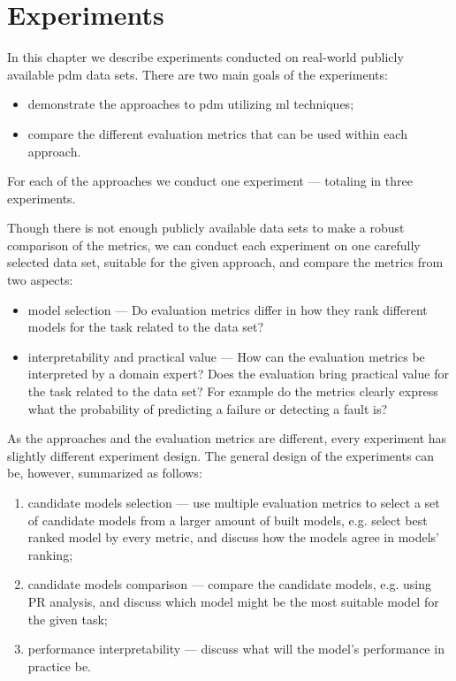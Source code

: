 \chapter{Experiments}
\label{chapter:experiments}

In this chapter we describe experiments conducted on real-world publicly available \gls{pdm} data sets.
There are two main goals of the experiments:
\begin{itemize}
    \item demonstrate the approaches to \gls{pdm} utilizing \gls{ml} techniques;
    \item compare the different evaluation metrics that can be used within each approach.
\end{itemize}
For each of the approaches we conduct one experiment --- totaling in three experiments.

Though there is not enough publicly available data sets to make a robust comparison of the metrics, we can conduct each experiment on one carefully selected data set, suitable for the given approach, and compare the metrics from two aspects:
\begin{itemize}
    \item model selection --- Do evaluation metrics differ in how they rank different models for the task related to the data set?
    \item interpretability and practical value --- How can the evaluation metrics be interpreted by a domain expert? Does the evaluation bring practical value for the task related to the data set? For example do the metrics clearly express what the probability of predicting a failure or detecting a fault is?
\end{itemize}

As the approaches and the evaluation metrics are different, every experiment has slightly different experiment design.
The general design of the experiments can be, however, summarized as follows:
\begin{enumerate}
    \item candidate models selection --- use multiple evaluation metrics to select a set of candidate models from a larger amount of built models, e.g. select best ranked model by every metric, and discuss how the models agree in models' ranking;
    \item candidate models comparison --- compare the candidate models, e.g. using PR analysis, and discuss which model might be the most suitable model for the given task;
    \item performance interpretability --- discuss what will the model's performance in practice be.
\end{enumerate}

